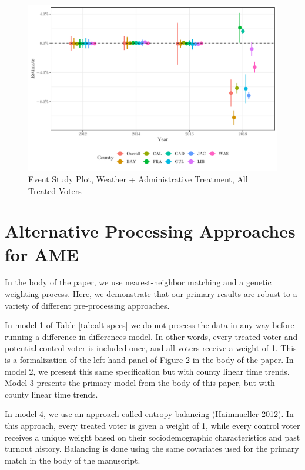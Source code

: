 \documentclass[
  12pt,
]{article}
\begin{document}
\begin{figure}[H]

{\centering \includegraphics{si_files/figure-latex/es1-1} 

}

\caption{\label{fig:es-1}Event Study Plot, Weather + Administrative Treatment, All Treated Voters}\label{fig:es1}
\end{figure}

\hypertarget{alternative-processing-approaches-for-ame}{%
\section*{Alternative Processing Approaches for AME}\label{alternative-processing-approaches-for-ame}}

In the body of the paper, we use nearest-neighbor matching and a genetic weighting process. Here, we demonstrate that our primary results are robust to a variety of different pre-processing approaches.

In model 1 of Table \ref{tab:alt-specs} we do not process the data in any way before running a difference-in-differences model. In other words, every treated voter and potential control voter is included once, and all voters receive a weight of 1. This is a formalization of the left-hand panel of Figure 2 in the body of the paper. In model 2, we present this same specification but with county linear time trends. Model 3 presents the primary model from the body of this paper, but with county linear time trends.

In model 4, we use an approach called entropy balancing (\protect\hyperlink{ref-Hainmueller2012}{Hainmueller 2012}). In this approach, every treated voter is given a weight of 1, while every control voter receives a unique weight based on their sociodemographic characteristics and past turnout history. Balancing is done using the same covariates used for the primary match in the body of the manuscript.
\end{document}
